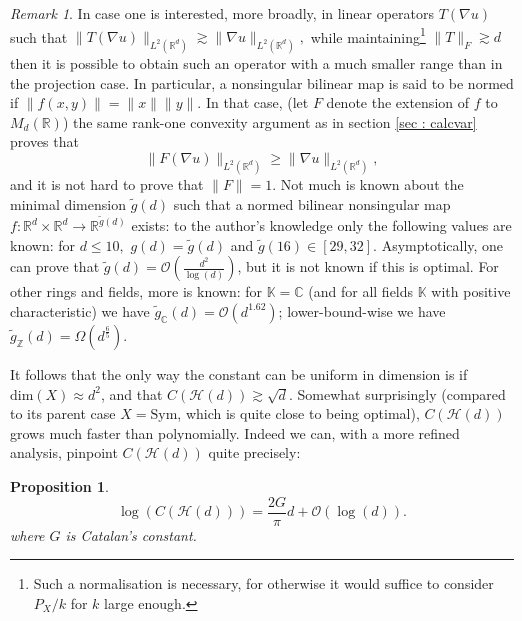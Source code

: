 \documentclass[11pt, a4paper, reqno]{elsarticle}
\newtheorem{proposition}{Proposition}[section]
\theoremstyle{definition}
\theoremstyle{remark}
\newtheorem{remark}{Remark}
\begin{document}
\begin{remark}
    In case one is interested, more 
    broadly, in linear operators 
    $T(\nabla u)$
    such that $\|T(\nabla u)\|_{L^2(\mathbb{R}^d)}\gtrsim 
    \|\nabla u\|_{L^2(\mathbb{R}^d)},$ while
    maintaining\footnote{Such a normalisation is 
    necessary, for otherwise 
    it would suffice to consider $P_X/k$ for $k$ large enough.} $\|T\|_{F}\gtrsim 
    d$ then it is 
    possible to obtain
    such an operator with a much smaller
    range than in the projection case.
    In particular, a nonsingular bilinear
    map is said to be normed if $\|f(x,y)\|=\|x\|\|y\|$. In that case,
    (let $F$ denote the extension of $f$ to $M_d(\mathbb{R})$) the same rank-one convexity argument
    as in section \ref{sec : calcvar} proves that
    \begin{equation*}
        \|F(\nabla u)\|_{L^2(\mathbb{R}^d)}\ge \|\nabla u\|_{L^2(\mathbb{R}^d)},
    \end{equation*}
    and it is not hard to prove that
    $\|F\|=1$.
    Not much is known about the minimal dimension $\tilde g(d)$ such that a normed
    bilinear nonsingular map $f\colon\mathbb{R}^d\times \mathbb{R}^d\to \mathbb{R}^{\tilde g(d)}$ exists: to the author's knowledge only
    the following values are known: for $d\le 10,$
    $g(d)= \tilde g(d)$ and $\tilde g(16)\in [29,32]$. Asymptotically, one 
    can prove that $\tilde g(d)=\mathcal O\left(\frac{d^2}{\log(d)}\right)$, but
    it is not known if this is optimal.
    For other rings
    and fields, more is known: for $\mathbb K=\mathbb{C}$ (and for all fields $\mathbb K$ with positive characteristic) we
    have $\tilde g_{\mathbb{C}}(d)=\mathcal O(d^{1.62})$; lower-bound-wise
    we have $\tilde g_{\mathbb Z}(d)=\Omega(d^{\frac 65}).$
\end{remark}
It follows that the only way the constant can be uniform in dimension
is if $\mathrm{dim}(X)\approx d^2$, and that $C(\mathcal H(d))\gtrsim \sqrt d$. Somewhat surprisingly (compared to its parent
case $X=\mathrm{Sym}$, which is quite close to being optimal), $C(\mathcal H(d))$ grows much faster than polynomially. 
Indeed we can, with a more refined analysis,
pinpoint $C(\mathcal H(d))$ quite precisely:
\begin{proposition}
\begin{equation*}
    \log(C(\mathcal H(d)))=\frac{2G}\pi d+\mathcal O(\log(d)).
\end{equation*}
where $G$ is Catalan's constant.
\end{proposition}
\end{document}
